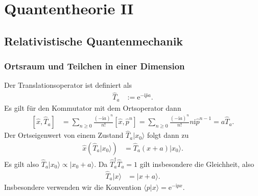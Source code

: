 \documentclass[english, parskip=full]{scrreport}
\title{\titel}
\author{\autor}
\date{\today}
\newcommand{\brak}{}
\newcommand{\braket}{}
\newcommand{\intr}{}
\newcommand{\kla}{}
\newcommand{\klam}{}
\newcommand{\Ket}{}
\renewcommand{\i}{\text{i}}
\newcommand{\e}{\text{e}}
\begin{document}
\maketitle  %


\chapter{Quantentheorie II}
\section{Relativistische Quantenmechanik}
\subsection{Ortsraum und Teilchen in einer Dimension}
Der Translationsoperator ist definiert als
\begin{align}
\hat{T}_a &:= \e^{-\i\hat{p}a}.
\end{align}
Es gilt für den Kommutator mit dem Ortsoperator dann
\begin{align}
\klam\left[ \hat{x}, \hat{T}_a \right] &= \sum_{n\ge 0}\frac{(-\i a)^n}{n!}\klam\left[ \hat{x}, \hat{p}^n \right] = \sum_{n\ge 0}\frac{(-\i a)^n}{n!} n\i\hat{p}^{n-1} = a\hat{T}_a.
\end{align}
Der Ortseigenwert von einem Zustand $\hat{T}_a\Ket | x_0 \rangle$ folgt dann zu
\begin{align}
\hat{x}\kla\left( \hat{T}_a\Ket | x_0 \rangle \right) &= \hat{T}_a\kla\left( x + a \right)\Ket | x_0 \rangle.
\end{align}
Es gilt also $\hat{T}_a\Ket | x_0 \rangle\propto \Ket | x_0 + a \rangle$.
Da $\hat{T}_a^\dagger\hat{T}_a = 1$ gilt insbesondere die Gleichheit, also
\begin{align}
\hat{T}_a\Ket | x \rangle &= \Ket | x + a \rangle.
\end{align}
Insbesondere verwenden wir die Konvention $\brak\langle p | x \rangle = \e^{-\i px}$.

\end{document}
